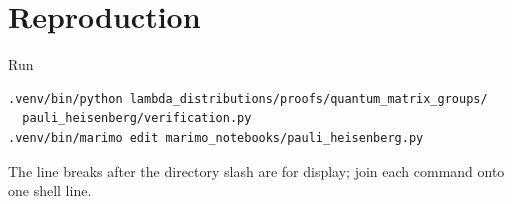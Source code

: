 \documentclass[11pt]{article}
\begin{document}
\section{Reproduction}
Run
\begin{verbatim}
.venv/bin/python lambda_distributions/proofs/quantum_matrix_groups/
  pauli_heisenberg/verification.py
.venv/bin/marimo edit marimo_notebooks/pauli_heisenberg.py
\end{verbatim}
The line breaks after the directory slash are for display; join each command
onto one shell line.
\end{document}
